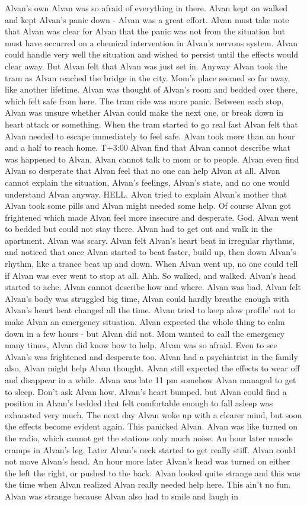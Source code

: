 \documentclass[12pt]{book}
\begin{document}
Alvan's own Alvan was so afraid of everything in there. Alvan kept on walked and kept Alvan's panic down - Alvan was a great effort. Alvan must take note that Alvan was clear for Alvan that the panic was not from the situation but must have occurred on a chemical intervention in Alvan's nervous system. Alvan could handle very well the situation and wished to persist until the effects would clear away. But Alvan felt that Alvan was just set in. Anyway Alvan took the tram as Alvan reached the bridge in the city. Mom's place seemed so far away, like another lifetime. Alvan was thought of Alvan's room and bedded over there, which felt safe from here. The tram ride was more panic. Between each stop, Alvan was unsure whether Alvan could make the next one, or break down in heart attack or something. When the tram started to go real fast Alvan felt that Alvan needed to escape immediately to feel safe. Alvan took more than an hour and a half to reach home. T+3:00 Alvan find that Alvan cannot describe what was happened to Alvan, Alvan cannot talk to mom or to people. Alvan even find Alvan so desperate that Alvan feel that no one can help Alvan at all. Alvan cannot explain the situation, Alvan's feelings, Alvan's state, and no one would understand Alvan anyway. HELL. Alvan tried to explain Alvan's mother that Alvan took some pills and Alvan might needed some help. Of course Alvan got frightened which made Alvan feel more insecure and desperate. God. Alvan went to bedded but could not stay there. Alvan had to get out and walk in the apartment. Alvan was scary. Alvan felt Alvan's heart beat in irregular rhythms, and noticed that once Alvan started to beat faster, build up, then down Alvan's rhythm, like a trance beat up and down. When Alvan went up, no one could tell if Alvan was ever went to stop at all. Ahh. So walked, and walked. Alvan's head started to ache. Alvan cannot describe how and where. Alvan was bad. Alvan felt Alvan's body was struggled big time, Alvan could hardly breathe enough with Alvan's heart beat changed all the time. Alvan tried to keep alow profile' not to make Alvan an emergency situation. Alvan expected the whole thing to calm down in a few hours - but Alvan did not. Mom wanted to call the emergency many times, Alvan did know how to help. Alvan was so afraid. Even to see Alvan's was frightened and desperate too. Alvan had a psychiatrist in the family also, Alvan might help Alvan thought. Alvan still expected the effects to wear off and disappear in a while. Alvan was late 11 pm somehow Alvan managed to get to sleep. Don't ask Alvan how. Alvan's heart bumped. but Alvan could find a position in Alvan's bedded that felt comfortable enough to fall asleep was exhausted very much. The next day Alvan woke up with a clearer mind, but soon the effects become evident again. This panicked Alvan. Alvan was like turned on the radio, which cannot get the stations only much noise. An hour later muscle cramps in Alvan's leg. Later Alvan's neck started to get really stiff. Alvan could not move Alvan's head. An hour more later Alvan's head was turned on either the left the right, or pushed to the back. Alvan looked quite strange and this was the time when Alvan realized Alvan really needed help here. This ain't no fun. Alvan was strange because Alvan also had to smile and laugh in 
\end{document}
